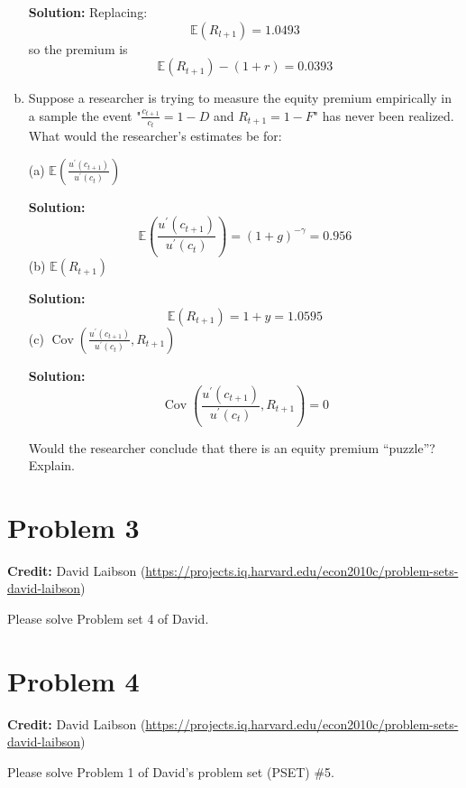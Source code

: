 \documentclass[11pt]{extarticle}
\theoremstyle{plain}
\theoremstyle{definition}
\begin{document}
\begin{enumerate}[(a)]
\textbf{Solution:} Replacing:
$$
\mathbb{E}\left(R_{l+1}\right)=1.0493
$$
so the premium is
$$
\mathbb{E}\left(R_{t+1}\right)-(1+r)=0.0393
$$

\item Suppose a researcher is trying to measure the equity premium empirically in a sample  the event "$\frac{c_{t+1}}{c_{t}}=1-D$ and $R_{t+1}=1-F$" has never been realized. What would the researcher's estimates be for:

(a) $\mathbb{E}\left(\frac{u^{\prime}\left(c_{t+1}\right)}{u^{\prime}\left(c_t\right)}\right)$

\textbf{Solution:}
$$
\mathbb{E}\left(\frac{u^{\prime}\left(c_{t+1}\right)}{u^{\prime}\left(c_t\right)}\right)=(1+g)^{-\gamma}=0.956
$$
(b) $\mathbb{E}\left(R_{t+1}\right)$

\textbf{Solution:}
$$
\mathbb{E}\left(R_{t+1}\right)=1+y=1.0595
$$
(c) $\operatorname{Cov}\left(\frac{u^{\prime}\left(c_{t+1}\right)}{u^{\prime}\left(c_t\right)}, R_{t+1}\right)$

\textbf{Solution:}
$$
\operatorname{Cov}\left(\frac{u^{\prime}\left(c_{t+1}\right)}{u^{\prime}\left(c_t\right)}, R_{t+1}\right)=0
$$

Would the researcher conclude that there is an equity premium “puzzle”? Explain.
\end{enumerate}


\vspace{10mm}
\section*{Problem 3} 

\textbf{Credit:} David Laibson (\url{https://projects.iq.harvard.edu/econ2010c/problem-sets-david-laibson})

Please solve Problem set 4 of David.



\vspace{10mm}
\section*{Problem 4} 

\textbf{Credit:} David Laibson (\url{https://projects.iq.harvard.edu/econ2010c/problem-sets-david-laibson})

Please solve Problem 1 of David’s problem set (PSET) \#5.
\end{document}
